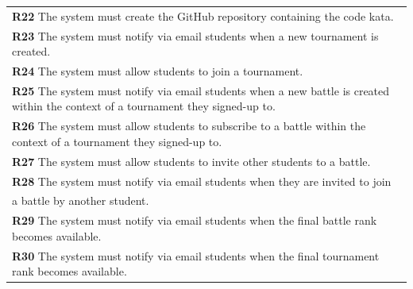 \begin{table}[H]
\begin{tabularx}{\textwidth}{X}
        \textbf{R22} The system must create the GitHub repository containing the code kata.               \\ 
        \textbf{R23} The system must notify via email students when a new tournament is created.            \\ 
        \textbf{R24} The system must allow students to join a tournament.     \\ 
        \textbf{R25} The system must notify via email students when a new battle is created within the context of a tournament they signed-up to.        \\ 
        \textbf{R26} The system must allow students to subscribe to a battle  within the context of a tournament they signed-up to.            \\
        \textbf{R27} The system must allow students to invite other students to a battle.     \\ 
        \textbf{R28} The system must notify via email students when they are invited to join \\ a battle by another student.        \\ 
        \textbf{R29} The system must notify via email students when the final battle rank becomes available.       \\ 
        \textbf{R30} The system must notify via email students when the final tournament rank becomes available.     \\ 
        
    \end{tabularx}
\end{table}

